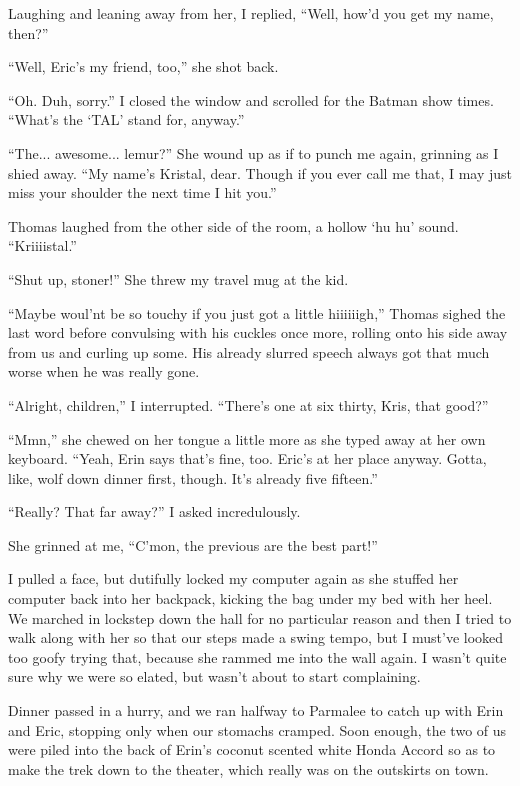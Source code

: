 Laughing and leaning away from her, I replied, ``Well, how'd you get my name, then?''

``Well, Eric's my friend, too,'' she shot back.

``Oh.  Duh, sorry.''  I closed the window and scrolled for the Batman show times.  ``What's the `TAL' stand for, anyway.''

``The... awesome... lemur?''  She wound up as if to punch me again, grinning as I shied away.  ``My name's Kristal, dear.  Though if you ever call me that, I may just miss your shoulder the next time I hit you.''

Thomas laughed from the other side of the room, a hollow `hu hu' sound.  ``Kriiiistal.''

``Shut up, stoner!''  She threw my travel mug at the kid.

``Maybe woul'nt be so touchy if you just got a little hiiiiiigh,'' Thomas sighed the last word before convulsing with his cuckles once more, rolling onto his side away from us and curling up some.  His already slurred speech always got that much worse when he was really gone.

``Alright, children,'' I interrupted.  ``There's one at six thirty, Kris, that good?''

``Mmn,'' she chewed on her tongue a little more as she typed away at her own keyboard.  ``Yeah, Erin says that's fine, too.  Eric's at her place anyway.  Gotta, like, wolf down dinner first, though.  It's already five fifteen.''

``Really?  That far away?''  I asked incredulously.

She grinned at me, ``C'mon, the previous are the best part!''

I pulled a face, but dutifully locked my computer again as she stuffed her computer back into her backpack, kicking the bag under my bed with her heel.  We marched in lockstep down the hall for no particular reason and then I tried to walk along with her so that our steps made a swing tempo, but I must've looked too goofy trying that, because she rammed me into the wall again.  I wasn't quite sure why we were so elated, but wasn't about to start complaining.

Dinner passed in a hurry, and we ran halfway to Parmalee to catch up with Erin and Eric, stopping only when our stomachs cramped.  Soon enough, the two of us were piled into the back of Erin's coconut scented white Honda Accord so as to make the trek down to the theater, which really was on the outskirts on town.

